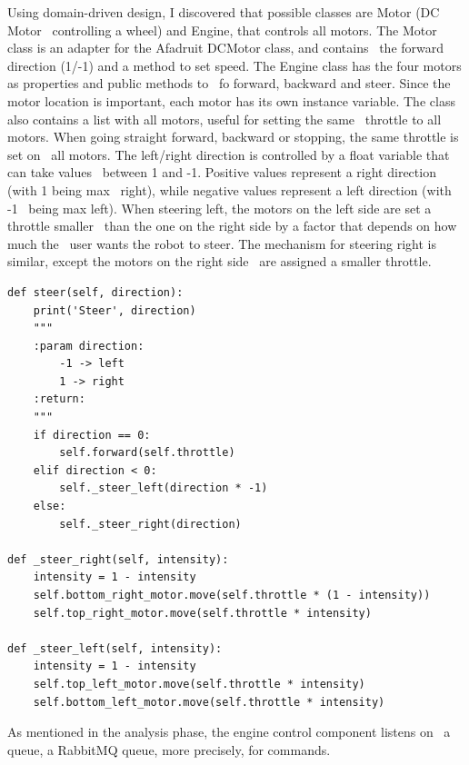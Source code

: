 Using domain-driven design, I discovered that possible classes are Motor (DC Motor \
controlling a wheel) and Engine, that controls all motors.
The Motor class is an adapter for the Afadruit DCMotor class, and contains \
the forward direction (1/-1) and a method to set speed.
The Engine class has the four motors as properties and public methods to \
fo forward, backward and steer.
Since the motor location is important, each motor has its own instance variable.
The class also contains a list with all motors, useful for setting the same \
throttle to all motors.
When going straight forward, backward or stopping, the same throttle is set on \
all motors.
The left/right direction is controlled by a float variable that can take values \
between 1 and -1.
Positive values represent a right direction (with 1 being max \
right), while negative values represent a left direction (with -1 \
being max left).
When steering left, the motors on the left side are set a throttle smaller \
than the one on the right side by a factor that depends on how much the \
user wants the robot to steer.
The mechanism for steering right is similar, except the motors on the right side \
are assigned a smaller throttle.
\begin{verbatim}
def steer(self, direction):
    print('Steer', direction)
    """
    :param direction:
        -1 -> left
        1 -> right
    :return:
    """
    if direction == 0:
        self.forward(self.throttle)
    elif direction < 0:
        self._steer_left(direction * -1)
    else:
        self._steer_right(direction)

def _steer_right(self, intensity):
    intensity = 1 - intensity
    self.bottom_right_motor.move(self.throttle * (1 - intensity))
    self.top_right_motor.move(self.throttle * intensity)

def _steer_left(self, intensity):
    intensity = 1 - intensity
    self.top_left_motor.move(self.throttle * intensity)
    self.bottom_left_motor.move(self.throttle * intensity)

\end{verbatim}
As mentioned in the analysis phase, the engine control component listens on \
a queue, a RabbitMQ queue, more precisely, for commands.

